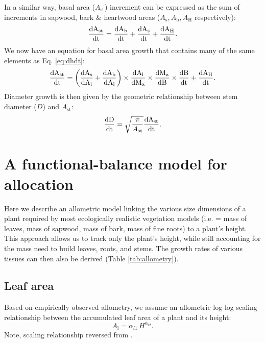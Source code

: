 \documentclass[10pt,twoside]{article}
\begin{document}
In a similar way, basal area ($A_\textrm{st}$) increment can be
expressed as the sum of increments in sapwood, bark \& heartwood areas
($A_\textrm{s}, A_\textrm{b}, A_\textrm{H}$ respectively):
$$\frac{\rm{d}A_\textrm{st}}{\rm{d}t} = \frac{\rm{d}A_\textrm{b}}{\rm{d}t} + \frac{\rm{d}A_\textrm{s}}{\rm{d}t} + \frac{\rm{d}A_\textrm{H}}{\rm{d}t}.$$
We now have an equation for basal area growth that contains many of the same
elements as Eq. \ref{eq:dhdt}:
\begin{equation}\label{eq:dast}
\frac{\rm{d}A_\textrm{st}}{\rm{d}t} = \left(\frac{\rm{d}A_\textrm{s}}{\rm{d}A_\textrm{l}} + \frac{\rm{d}A_\textrm{b}}{\rm{d}A_\textrm{l}}\right) \times
\frac{\rm{d}A_\textrm{l}}{\rm{d}M_\textrm{a}} \times \frac{\rm{d}M_\textrm{a}}{\rm{d}B} \times \frac{\rm{d}B}{\rm{d}t} + \frac{\rm{d}A_\textrm{H}}{\rm{d}t} .
\end{equation}
Diameter growth is then given by the geometric relationship between stem
diameter ($D$) and $A_\textrm{st}$:
\begin{equation} \label{eq:dDdt}
\frac{\rm{d}D}{\rm{d}t} = \sqrt{\frac{\pi}{A_\textrm{st}}} \frac{\rm{d}A_\textrm{st}}{\rm{d}t}.
\end{equation}

\section{A functional-balance model for
allocation}\label{a-functional-balance-model-for-allocation}

Here we describe an allometric model linking the various size dimensions
of a plant required by most ecologically realistic vegetation models
(i.e. = mass of leaves, mass of sapwood, mass of bark, mass of fine
roots) to a plant's height. This approach allows us to track only the
plant's height, while still accounting for the mass need to build
leaves, roots, and stems. The growth rates of various tissues can then
also be derived (Table \ref{tab:allometry}).

\subsection{Leaf area}\label{leaf-area}

Based on empirically observed allometry, we assume an allometric log-log
scaling relationship between the accumulated leaf area of a plant and
its height:
\begin{equation}\label{eq:ha}
A_\textrm{l} = \alpha_{l1} \, H^{\alpha_{l2}}.
\end{equation}
Note, scaling relationship reversed from \citep{Falster-2011}.
\end{document}
